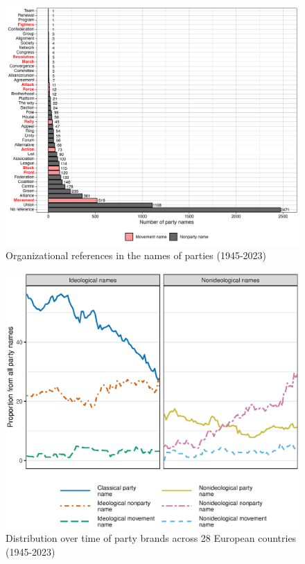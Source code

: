 \documentclass[12pt]{article}
\begin{document}
\clearpage

\begin{figure}[H]
\includegraphics[width=\textwidth]{./Figures/org_types.png}
\caption{Organizational references in the names of parties (1945-2023)}
\end{figure}

\clearpage

\begin{figure}[H]
\caption{Distribution over time of party brands across 28 European countries (1945-2023)}
\label{Fig:timeline}
\includegraphics[width=\textwidth]{./Figures/all_types.eps}
\end{figure}
\end{document}
